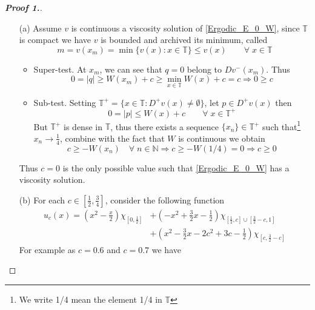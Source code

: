 \documentclass[12pt, oneside]{amsart}  	%
\begin{document}
\begin{proof}[\textbf{Proof 1.}]\quad
\begin{itemize}
\item[(a)] Assume $v$ is continuous a viscosity solution of \eqref{Ergodic_E_0_W}, since $\mathbb{T}$ is compact we have $v$ is bounded and archived its minimum, called 
$$m = v(x_m) = \min \{v(x):x\in \mathbb{T}\} \leq v(x) \qquad\forall\;x\in \mathbb{T} $$
\begin{itemize}
\item Super-test. At $x_m$, we can see that $q = 0$ belong to $Dv^-(x_m)$. Thus
\begin{equation*}
0 = |q| \geq W(x_m)+c \geq \min_{x\in \mathbb{T}} W(x) + c = c \Longrightarrow 0\geq c
\end{equation*}
\item Sub-test. Setting $\mathbb{T}^+ = \{x\in \mathbb{T}: D^+v(x) \neq \emptyset\}$, let $p\in D^+v(x)$ then
\begin{equation*}
0 = |p| \leq W(x)+c \qquad\forall\; x\in \mathbb{T}^+
\end{equation*}
But $\mathbb{T}^+$ is dense in $\mathbb{T}$, thus there exists a sequence $\{x_n\}\in \mathbb{T}^+$ such that\footnote{We write 1/4 mean the element 1/4 in $\mathbb{T}$} $x_n\longrightarrow \frac{1}{4}$, combine with the fact that $W$ is continuous we obtain
\begin{equation*}
c\geq -W(x_n) \quad\forall\;n\in \mathbb{N} \Longrightarrow c \geq -W\left(1/4\right) = 0 \Longrightarrow c\geq 0
\end{equation*}

\end{itemize}
Thus $c = 0$ is the only possible value such that \eqref{Ergodic_E_0_W} has a viscosity solution. 

\item[(b)] For each $c\in \left[\frac{1}{2},\frac{3}{4}\right]$, consider the following function
\begin{align*}
u_c(x) = \left(x^2-\frac{x}{2}\right)\chi_{\left[0,\frac{1}{2}\right]} &+ \left(-x^2 + \frac{3}{2}x - \frac{1}{2}\right)\chi_{\left[\frac{1}{2},c\right]\cup \left[\frac{3}{2}-c,1\right]}\\
&+ \left(x^2-\frac{3}{2}x -2c^2 + 3c-\frac{1}{2}\right)\chi_{\left[c,\frac{3}{2}-c\right]} 
\end{align*}
For example as $c = 0.6$ and $c= 0.7$ we have


\end{itemize}
\end{proof}
\end{document}
